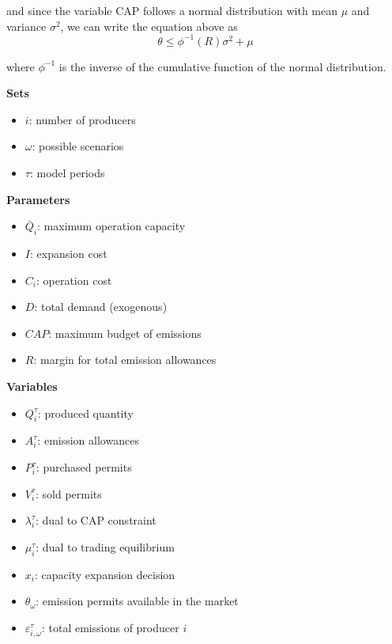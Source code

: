 \documentclass[11pt, letterpaper]{article}
\begin{document}
and since the variable CAP follows a normal distribution with mean $\mu$ and variance $\sigma^2$, we can write the equation above as
\begin{equation}
    \theta \leq \phi^{-1}(R) \sigma^2 + \mu
\end{equation}

where $\phi^{-1}$ is the inverse of the cumulative function of the normal distribution. 



\hspace{0.5cm}

\begin{flushleft}
\textbf{Sets}
\begin{itemize}
    \item[] $i$: number of producers
    \item[] $\omega$: possible scenarios
    \item[] $\tau$: model periods
    
\end{itemize}

\hspace{0.5cm}

\textbf{Parameters}
\begin{itemize}
   \item[] $\bar{Q}_i$: maximum operation capacity
   \item[] $I$: expansion cost
   \item[] $C_i$: operation cost
   \item[] $D$: total demand (exogenous)
   \item[] $CAP$: maximum budget of emissions 
   \item[] $R$: margin for total emission allowances
\end{itemize}
\hspace{0.5cm}

\textbf{Variables}
\begin{itemize}
    \item[] $Q^{\tau}_i$: produced quantity
    \item[] $A^{\tau}_i$: emission allowances
    \item[] $P^{\tau}_i$: purchased permits
    \item[] $V^{\tau}_i$: sold permits
    \item[] $\lambda^{\tau}_i$: dual to CAP constraint
    \item[] $\mu^{\tau}_i$: dual to trading equilibrium
    \item[] $x_i$: capacity expansion decision
    \item[] $\theta_{\omega}$: emission permits available in the market
    \item[] $\varepsilon^{\tau}_{i,\omega}$: total emissions of producer $i$
    \end{itemize}


\end{flushleft}
\end{document}

